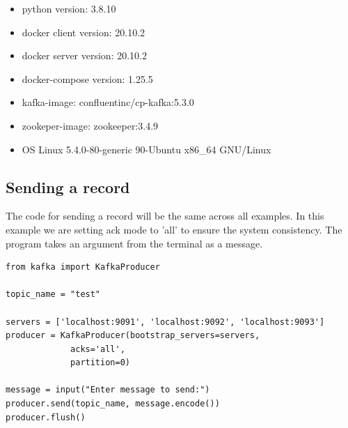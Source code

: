 \documentclass[11pt]{article}
\begin{document}
\begin{itemize}
	\item python version: 3.8.10
	\item docker client version: 20.10.2
	\item docker server version: 20.10.2
	\item docker-compose version: 1.25.5
	\item kafka-image: confluentinc/cp-kafka:5.3.0
	\item zookeper-image: zookeeper:3.4.9
	\item{OS Linux 5.4.0-80-generic 90-Ubuntu x86\_64 GNU/Linux}
\end{itemize}

\subsection{Sending a record}
The code for sending a record will be the same across all examples. In this example we are setting ack mode to 'all' to ensure the system consistency. The program takes an argument from the terminal as a message.
\newline
\begin{adjustwidth}{-30pt}{0pt}
\begin{Verbatim}
from kafka import KafkaProducer

topic_name = "test"

servers = ['localhost:9091', 'localhost:9092', 'localhost:9093']
producer = KafkaProducer(bootstrap_servers=servers,
			 acks='all',
			 partition=0)

message = input("Enter message to send:")
producer.send(topic_name, message.encode())
producer.flush()
\end{Verbatim}
\end{adjustwidth}

\clearpage
\end{document}
